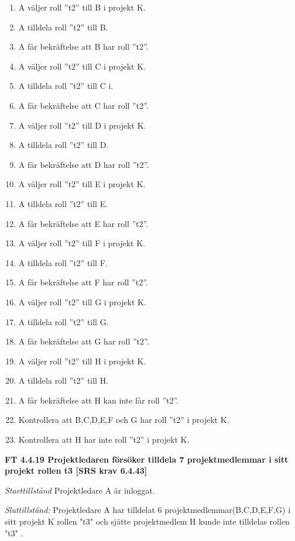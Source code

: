 \documentclass[a4paper]{article}
\begin{document}
\begin{enumerate}
\item A väljer roll ”t2” till B i projekt K. 
\item A tilldela roll ”t2” till B. 
\item A får bekräftelse att B har roll ”t2”.
\item A väljer roll ”t2” till C i projekt K.
\item A tilldela roll ”t2” till C i. 
\item A får bekräftelse att C har roll ”t2”.
\item A väljer roll ”t2” till D i projekt K. 
\item A tilldela roll ”t2” till D. 
\item A får bekräftelse att D har roll ”t2”.
\item A väljer roll ”t2” till E i projekt K. 
\item A tilldela roll ”t2” till E. 
\item A får bekräftelse att E har roll ”t2”.
\item A väljer roll ”t2” till F i projekt K. 
\item A tilldela roll ”t2” till F. 
\item A får bekräftelse att F har roll ”t2”.
\item A väljer roll ”t2” till G i projekt K. 
\item A tilldela roll ”t2” till G. 
\item A får bekräftelse att G har roll ”t2”.
\item A väljer roll ”t2” till H i projekt K. 
\item A tilldela roll ”t2” till H. 
\item A får bekräftelse att H kan inte får roll ”t2”.
\item Kontrollera att B,C,D,E,F och G har roll ”t2” i projekt K.
\item Kontrollera att H har inte roll ”t2” i projekt K.
\end{enumerate}

\textbf{FT 4.4.19 Projektledaren försöker tilldela 7 projektmedlemmar i sitt projekt rollen t3 [SRS krav 6.4.43]}

\emph{Starttillstånd} Projektledare A är inloggat.

\emph{Sluttillstånd:} Projektledare A  har tilldelat 6 projektmedlemmar(B,C,D,E,F,G) i sitt projekt K rollen "t3" och sjätte projektmedlem H kunde inte tilldelas rollen "t3" .
\end{document}
